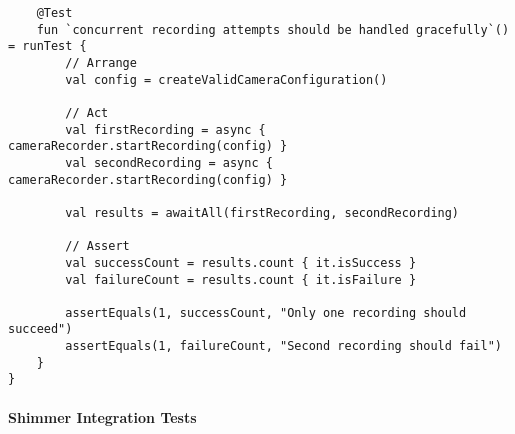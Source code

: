 \documentclass[11pt,a4paper]{report}
\begin{document}
\begin{verbatim}
    @Test
    fun `concurrent recording attempts should be handled gracefully`() = runTest {
        // Arrange
        val config = createValidCameraConfiguration()

        // Act
        val firstRecording = async { cameraRecorder.startRecording(config) }
        val secondRecording = async { cameraRecorder.startRecording(config) }

        val results = awaitAll(firstRecording, secondRecording)

        // Assert
        val successCount = results.count { it.isSuccess }
        val failureCount = results.count { it.isFailure }

        assertEquals(1, successCount, "Only one recording should succeed")
        assertEquals(1, failureCount, "Second recording should fail")
    }
}
\end{verbatim}

\paragraph{Shimmer Integration Tests}
\end{document}

